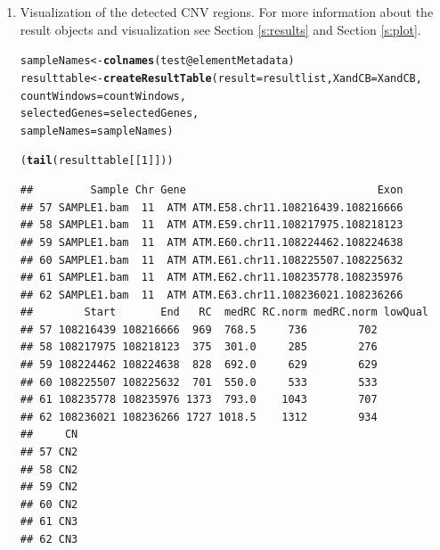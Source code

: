 \documentclass[article]{bioinf}\usepackage[]{graphicx}\usepackage[]{color}
\makeatletter
\newcommand{\hlnum}[1]{\textcolor[rgb]{0.686,0.059,0.569}{#1}}%
\newcommand{\hlopt}[1]{\textcolor[rgb]{0,0,0}{#1}}%
\newcommand{\hlstd}[1]{\textcolor[rgb]{0.345,0.345,0.345}{#1}}%
\newcommand{\hlkwb}[1]{\textcolor[rgb]{0.69,0.353,0.396}{#1}}%
\newcommand{\hlkwc}[1]{\textcolor[rgb]{0.333,0.667,0.333}{#1}}%
\newcommand{\hlkwd}[1]{\textcolor[rgb]{0.737,0.353,0.396}{\textbf{#1}}}%
\newenvironment{kframe}{%
 \def\at@end@of@kframe{}%
 \ifinner\ifhmode%
  \def\at@end@of@kframe{\end{minipage}}%
  \begin{minipage}{\columnwidth}%
 \fi\fi%
 \def\FrameCommand##1{\hskip\@totalleftmargin \hskip-\fboxsep
 \colorbox{shadecolor}{##1}\hskip-\fboxsep
     \hskip-\linewidth \hskip-\@totalleftmargin \hskip\columnwidth}%
 \MakeFramed {\advance\hsize-\width
   \@totalleftmargin\z@ \linewidth\hsize
   \@setminipage}}%
 {\par\unskip\endMakeFramed%
 \at@end@of@kframe}
\newenvironment{knitrout}{}{} %
\makeatother
\begin{document}
\begin{enumerate}
\item Visualization of the detected CNV regions. For more information about
the result objects and visualization see Section \ref{s:results} and 
Section \ref{s:plot}.






\begin{knitrout}
\color{fgcolor}\begin{kframe}
\begin{alltt}
\hlstd{sampleNames} \hlkwb{<-} \hlkwd{colnames}\hlstd{(test}\hlopt{@}\hlkwc{elementMetadata}\hlstd{)}
\hlstd{resulttable} \hlkwb{<-} \hlkwd{createResultTable}\hlstd{(}\hlkwc{result} \hlstd{= resultlist,} \hlkwc{XandCB} \hlstd{= XandCB,}
                                 \hlkwc{countWindows} \hlstd{= countWindows,}
                                 \hlkwc{selectedGenes} \hlstd{= selectedGenes,}
                                 \hlkwc{sampleNames} \hlstd{= sampleNames)}
\end{alltt}


{\ttfamily\noindent\itshape\color{messagecolor}{\#\# Calculating results for sample(s) SAMPLE1.bam}}

{\ttfamily\noindent\itshape\color{messagecolor}{\#\# Building table...}}

{\ttfamily\noindent\itshape\color{messagecolor}{\#\# Finished}}\begin{alltt}
\hlstd{(}\hlkwd{tail}\hlstd{(resulttable[[}\hlnum{1}\hlstd{]]))}
\end{alltt}
\begin{verbatim}
##         Sample Chr Gene                              Exon
## 57 SAMPLE1.bam  11  ATM ATM.E58.chr11.108216439.108216666
## 58 SAMPLE1.bam  11  ATM ATM.E59.chr11.108217975.108218123
## 59 SAMPLE1.bam  11  ATM ATM.E60.chr11.108224462.108224638
## 60 SAMPLE1.bam  11  ATM ATM.E61.chr11.108225507.108225632
## 61 SAMPLE1.bam  11  ATM ATM.E62.chr11.108235778.108235976
## 62 SAMPLE1.bam  11  ATM ATM.E63.chr11.108236021.108236266
##        Start       End   RC  medRC RC.norm medRC.norm lowQual
## 57 108216439 108216666  969  768.5     736        702        
## 58 108217975 108218123  375  301.0     285        276        
## 59 108224462 108224638  828  692.0     629        629        
## 60 108225507 108225632  701  550.0     533        533        
## 61 108235778 108235976 1373  793.0    1043        707        
## 62 108236021 108236266 1727 1018.5    1312        934        
##     CN
## 57 CN2
## 58 CN2
## 59 CN2
## 60 CN2
## 61 CN3
## 62 CN3
\end{verbatim}
\end{kframe}
\end{knitrout}




\end{enumerate}
\end{document}
